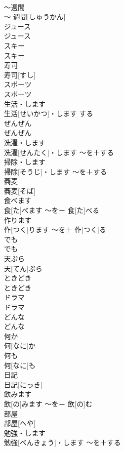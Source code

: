\documentclass[8pt]{extreport}
\begin{document}
\begin{CJK}{UTF8}{min}
\\	〜週間	
\\	〜 週間[しゅうかん]		
\\	ジュース	
\\	ジュース		
\\	スキー	
\\	スキー		
\\	寿司	
\\	寿司[すし]		
\\	スポーツ	
\\	スポーツ		
\\	生活・します	
\\	生活[せいかつ]・します	する	
\\	ぜんぜん	
\\	ぜんぜん		
\\	洗濯・します	
\\	洗濯[せんたく]・します	〜を＋する	
\\	掃除・します	
\\	掃除[そうじ]・します	〜を＋する	
\\	蕎麦	
\\	蕎麦[そば]		
\\	食べます	
\\	食[た]べます	〜を＋ 食[た]べる	
\\	作ります	
\\	作[つく]ります	〜を＋ 作[つく]る	
\\	でも	
\\	でも		
\\	天ぷら	
\\	天[てん]ぷら		
\\	ときどき	
\\	ときどき		
\\	ドラマ	
\\	ドラマ		
\\	どんな	
\\	どんな		
\\	何か	
\\	何[なに]か		
\\	何も	
\\	何[なに]も		
\\	日記	
\\	日記[にっき]		
\\	飲みます	
\\	飲[の]みます	〜を＋ 飲[の]む	
\\	部屋	
\\	部屋[へや]		
\\	勉強・します	
\\	勉強[べんきょう]・します	〜を＋する	

\end{CJK}
\end{document}
